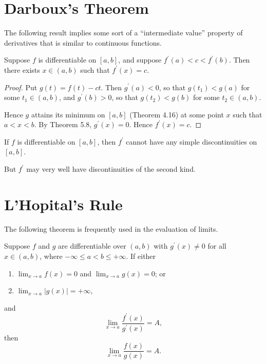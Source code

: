 \section{Darboux's Theorem}
The following result implies some sort of a ``intermediate value'' property of derivatives that is similar to continuous functions.

\begin{theorem}
Suppose $f$ is differentiable on $[a,b]$, and suppose $f^\prime(a)<c<f^\prime(b)$. Then there exists $x\in(a,b)$ such that $f^\prime(x)=c$.
\end{theorem}

\begin{proof}
Put $g(t)=f(t)-ct$. Then $g^\prime(a)<0$, so that $g(t_1)<g(a)$ for some $t_1\in(a,b)$, and $g^\prime(b)>0$, so that $g(t_2)<g(b)$ for some $t_2\in(a,b)$.

Hence $g$ attains its minimum on $[a,b]$ (Theorem 4.16) at some point $x$ such that $a<x<b$. By Theorem 5.8, $g^\prime(x)=0$. Hence $f^\prime(x)=c$.
\end{proof}

\begin{corollary}
If $f$ is differentiable on $[a,b]$, then $f^\prime$ cannot have any simple discontinuities on $[a,b]$.
\end{corollary}

\begin{remark}
But $f^\prime$ may very well have discontinuities of the second kind.
\end{remark}

\section{L'Hopital's Rule}
The following theorem is frequently used in the evaluation of limits.

\begin{theorem}
Suppose $f$ and $g$ are differentiable over $(a,b)$ with $g^\prime(x)\neq0$ for all $x\in(a,b)$, where $-\infty\le a<b\le+\infty$. If either
\begin{enumerate}[label=(\roman*)]
\item $\displaystyle\lim_{x\to a}f(x)=0$ and $\displaystyle\lim_{x\to a}g(x)=0$; or
\item $\displaystyle\lim_{x\to a}|g(x)|=+\infty$,
\end{enumerate}
and
\[\lim_{x\to a}\frac{f^\prime(x)}{g^\prime(x)}=A,\]
then
\[\lim_{x\to a}\frac{f(x)}{g(x)}=A.\]
\end{theorem}

